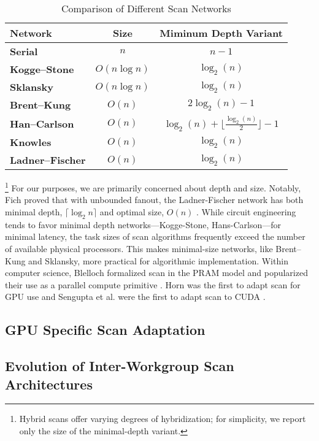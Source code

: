 \documentclass[sigconf]{acmart}
\begin{document}
 \begin{table}[h]
  \centering
  \caption{Comparison of Different Scan Networks}
  \label{tab:scan_comparison_exact}
  \begin{tabular}{|l|c|c|}
  \hline
  \textbf{Network}       & \textbf{Size}        & \textbf{Miminum Depth Variant} \\ \hline
  \textbf{Serial}           & $n$           & $n - 1$            \\ \hline
  \textbf{Kogge--Stone}     & $O(n \log n)$ & $\log_2(n)$        \\ \hline
  \textbf{Sklansky}         & $O(n \log n)$ & $\log_2(n)$        \\ \hline
  \textbf{Brent--Kung}      & $O(n)$        & $2 \log_2(n) - 1$  \\ \hline
  \textbf{Han--Carlson}     & $O(n)$        & $\log_2(n) + \Big\lfloor \tfrac{\log_2(n)}{2} \Big\rfloor - 1$ \\ \hline
  \textbf{Knowles}          & $O(n)$        & $\log_2(n)$        \\ \hline
  \textbf{Ladner--Fischer}  & $O(n)$        & $\log_2(n)$        \\ \hline
  \end{tabular}
\end{table}
 \footnote{Hybrid scans offer varying degrees of hybridization; for simplicity, we report only the size of the minimal-depth variant.}
 For our purposes, we are primarily concerned about depth and size. Notably, Fich proved that with unbounded fanout, the Ladner-Fischer network has both minimal depth, $\lceil \log_2n \rceil$ and optimal size, $O(n)$ \cite{}. While circuit engineering tends to favor minimal depth networks---Kogge-Stone, Hans-Carlson---for minimal latency, the task sizes of scan algorithms frequently exceed the number of available physical processors. This makes minimal-size networks, like Brent–Kung and Sklansky, more practical for algorithmic implementation. Within computer science, Blelloch formalized scan in the PRAM model and popularized their use as a parallel compute primitive \cite{}. Horn was the first to adapt scan for GPU use and Sengupta et al. were the first to adapt scan to CUDA \cite{}.

\subsection{GPU Specific Scan Adaptation}

\subsection{Evolution of Inter-Workgroup Scan Architectures}
\end{document}
